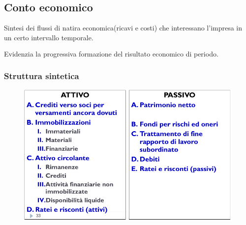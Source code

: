 \subsection{Conto economico}

Sintesi dei flussi di natira economica(ricavi e costi) che interessano l'impresa in un certo intervallo temporale.

Evidenzia la progressiva formazione del risultato economico di periodo.

\subsubsection{Struttura sintetica}
\begin{figure}[H]
    \centering
    \includegraphics[width=0.7\linewidth]{2/img/Screenshot from 2022-07-06 16-07-29.png}
\end{figure}
